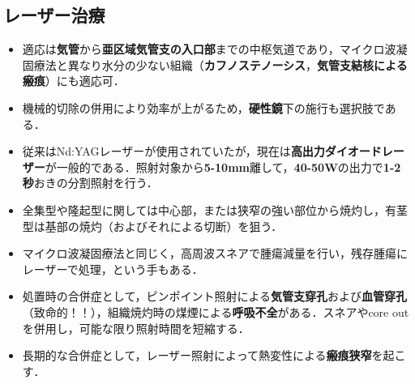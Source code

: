 \subsection{レーザー治療}
\begin{itemize}
\item 適応は\textbf{気管}から\textbf{亜区域気管支の入口部}までの中枢気道であり，マイクロ波凝固療法と異なり水分の少ない組織（\textbf{カフノステノーシス}，\textbf{気管支結核による瘢痕}）にも適応可．
\item 機械的切除の併用により効率が上がるため，\textbf{硬性鏡}下の施行も選択肢である．
\item 従来はNd:YAGレーザーが使用されていたが，現在は\textbf{高出力ダイオードレーザー}が一般的である．照射対象から\textbf{5-10mm}離して，\textbf{40-50W}の出力で\textbf{1-2秒}おきの分割照射を行う．
\item 全集型や隆起型に関しては中心部，または狭窄の強い部位から焼灼し，有茎型は基部の焼灼（およびそれによる切断）を狙う．
\item マイクロ波凝固療法と同じく，高周波スネアで腫瘍減量を行い，残存腫瘍にレーザーで処理，という手もある．
\item 処置時の合併症として，ピンポイント照射による\textbf{気管支穿孔}および\textbf{血管穿孔}（致命的！！），組織焼灼時の煤煙による\textbf{呼吸不全}がある．スネアやcore outを併用し，可能な限り照射時間を短縮する．
\item 長期的な合併症として，レーザー照射によって熱変性による\textbf{瘢痕狭窄}を起こす．
\end{itemize}

